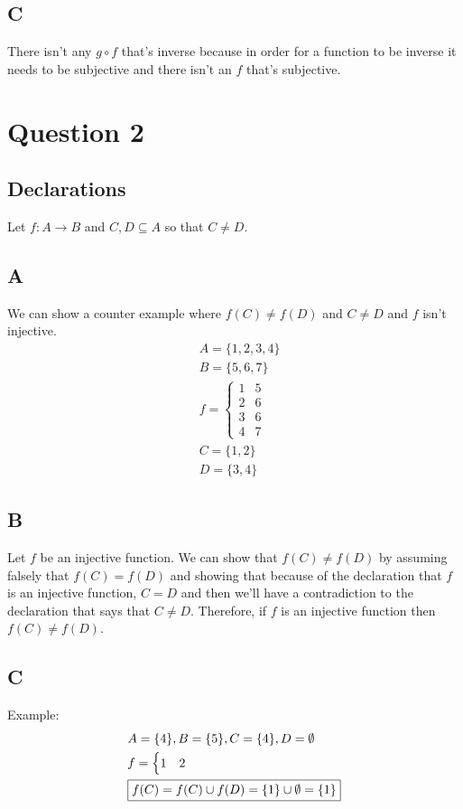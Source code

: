 \documentclass[12pt, oneside]{article}
\begin{document}
\subsection{C}
There isn't any $g \circ f$ that's inverse because in order for a function to be inverse it needs to be subjective and there isn't an $f$ that's subjective.
\clearpage

\section{Question 2}
\setcounter{subsection}{-1}
\subsection{Declarations}
Let $f: A \rightarrow B$ and $C, D \subseteq A$ so that $C \neq D$.

\subsection{A}
We can show a counter example where $f(C) \neq f(D)$ and $C \neq D$ and $f$ isn't injective.
\begin{eqnarray*}
& A = \{1, 2, 3, 4\}\\
& B = \{5, 6, 7\}\\
& f = 
	\begin{cases}
		1 & 5\\
		2 & 6\\
		3 & 6\\
		4 & 7
	\end{cases}\\
& C = \{1, 2\}\\
& D = \{3, 4\}
\end{eqnarray*}

\subsection{B}
Let $f$ be an injective function.
We can show that $f(C) \neq f(D)$ by assuming falsely that $f(C) = f(D)$ and showing that because of the declaration that $f$ is an injective function, $C = D$ and then we'll have a contradiction to the declaration that says that $C \neq D$. Therefore, if $f$ is an injective function then $f(C) \neq f(D)$.

\subsection{C}
Example:
\begin{eqnarray*}
& A = \{4\}, B = \{5\}, C = \{4\}, D = \emptyset\\
& f = 
	\begin{cases}
	1 & 2
	\end{cases}\\
& \framebox{$f(C) = f(C) \cup f(D) = \{1\} \cup \emptyset = \{1\}$}
\end{eqnarray*}
\end{document}
